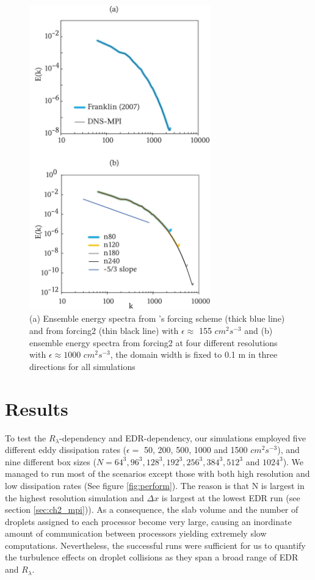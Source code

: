 \begin{figure}[ht]
\centering
\includegraphics[width=0.7\textwidth]{Figures/Chap2/specs.jpg}
\caption{(a) Ensemble energy spectra from \citet{Franklin2007}'s forcing scheme (thick blue line) and from forcing2 (thin black line) with $\epsilon \approx$ 155 $cm^2s^{-3}$ and (b) ensemble energy spectra from forcing2 at four different resolutions with $\epsilon \approx 1000$ $cm^2 s^{-3}$, the domain width is fixed to 0.1 m in three directions for all simulations} \label{fig:specs}
\end{figure}

\section{Results} \label{sec:ch2_result}

To test the $R_\lambda$-dependency and EDR-dependency, our simulations employed five different eddy dissipation rates ($\epsilon = $ 50, 200, 500, 1000 and 1500 $cm^2s^{-3}$), and nine different box sizes ($N = 64^3, 96^3, 128^3, 192^3, 256^3, 384^3, 512^3$ and $1024^3$). We managed to run most of the scenarios except those with both high resolution and low dissipation rates (See figure \ref{fig:perform}). The reason is that N is largest in the highest resolution simulation and $\Delta x$ is largest at the lowest EDR run (see section \ref{sec:ch2_mpi})). As a consequence, the slab volume and the number of droplets assigned to each processor become very large, causing an inordinate amount of communication between processors yielding extremely slow computations. Nevertheless, the successful runs were sufficient for us to quantify the turbulence effects on droplet collisions as they span a broad range of EDR and $R_\lambda$.

